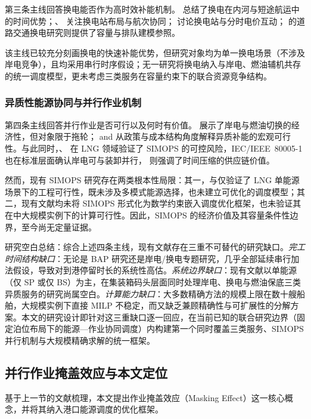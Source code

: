 \documentclass[UTF8, a4paper, 12pt]{ctexart}
\theoremstyle{plain}
\theoremstyle{definition}
\theoremstyle{remark}
\begin{document}
第三条主线回答换电能否作为高时效补能机制。\citet{Zhang2022_EShip} 总结了换电在内河与短途航运中的时间优势；\citet{Bei2024}、\citet{Zhang2024_Voyage} 关注换电站布局与航次协同；\citet{Li2022_BSS} 讨论换电站与分时电价互动；\citet{Mak2013} 的道路交通换电研究则提供了容量与排队建模参照。
 
该主线已较充分刻画换电的快速补能优势，但研究对象均为单一换电场景（不涉及岸电竞争），且均采用串行时序假设；无一研究将换电纳入与岸电、燃油辅机共存的统一调度模型，更未考虑三类服务在容量约束下的联合资源竞争结构。
 
\subsubsection{异质性能源协同与并行作业机制}
 
第四条主线回答并行作业是否可行以及何时有价值。\citet{Zhen2022_SP} 展示了岸电与燃油切换的经济性，但对象限于拖轮；\citet{Psaraftis2016} and \citet{Wang2023} 从政策与成本结构角度解释异质补能的宏观可行性。与此同时，\citet{Fan2021}、\citet{Fan2022_SIMOPS} 在 LNG 领域验证了 SIMOPS 的可控风险，IEC/IEEE~80005-1 \cite{IEC80005} 也在标准层面确认岸电可与装卸并行，\citet{Notteboom2006} 则强调了时间压缩的供应链价值。
 
然而，现有 SIMOPS 研究存在两类根本性局限：其一，\citet{Fan2021}与\citet{Fan2022_SIMOPS}仅验证了 LNG 单能源场景下的工程可行性，既未涉及多模式能源选择，也未建立可优化的调度模型；其二，现有文献均未将 SIMOPS 形式化为数学约束嵌入调度优化框架，也未验证其在中大规模实例下的计算可行性。因此，SIMOPS 的经济价值及其容量条件性边界，至今尚无定量证据。
 
研究空白总结：综合上述四条主线，现有文献存在三重不可替代的研究缺口。\emph{完工时间结构缺口}：无论是 BAP 研究还是岸电/换电专题研究，几乎全部延续串行加法假设，导致对到港停留时长的系统性高估。\emph{系统边界缺口}：现有文献以单能源（仅 SP 或仅 BS）为主，在集装箱码头层面同时处理岸电、换电与燃油保底三类异质服务的研究尚属空白。\emph{计算能力缺口}：大多数精确方法的规模上限在数十艘船舶，大规模实例下直接 MILP 不稳定，而又缺乏兼顾精确性与可扩展性的分解方案。本文的研究设计即针对这三重缺口逐一回应，在当前已知的联合研究边界（固定泊位布局下的能源—作业协同调度）内构建第一个同时覆盖三类服务、SIMOPS 并行机制与大规模精确求解的统一框架。
\subsection{并行作业掩盖效应与本文定位}
 
基于上一节的文献梳理，本文提出作业掩盖效应（Masking Effect）这一核心概念，并将其纳入港口能源调度的优化框架。
 
\end{document}
